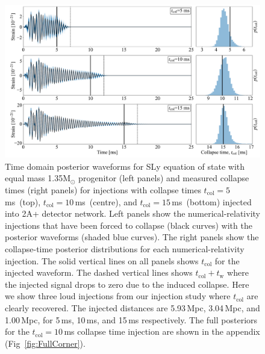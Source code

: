 \documentclass[
reprint,
prd,
twocolumn,
nofootinbib,
 amsmath,
showpacs ,amssymb, aps,%
superscriptaddress
]{revtex4-1}
\newcommand{\tc}{t_{\mathrm{col}}}
\newcommand{\tw}{t_{\mathrm{w}}}
\begin{document}
    
\begin{figure}[t]
        \centering
        \includegraphics[scale=0.35]{images/dec_tc10_dist_timeplot_panels.pdf}
        \caption{Time domain posterior waveforms for SLy equation of state with equal mass 1.35M${_\odot}$ progenitor (left panels) and measured collapse times (right panels) for injections with collapse times $\tc=5$\,ms~(top), $\tc=10$\,ms~(centre), and $\tc=15$\,ms~(bottom) injected into 2A+ detector network. Left panels show the numerical-relativity injections that have been forced to collapse (black curves) with the posterior waveforms (shaded blue curves). The right panels show the collapse-time posterior distributions for each numerical-relativity injection.
        The solid vertical lines on all panels shows  $\tc$ for the injected waveform. The dashed vertical lines shows  $\tc+\tw$ where the injected signal drops to zero due to the induced collapse. Here we show three loud injections from our injection study where $\tc$ are clearly recovered. The injected distances are 5.93\,Mpc, 3.04\,Mpc, and 1.00\,Mpc, for 5\,ms,  10\,ms, and  15\,ms respectively. The full posteriors for the $\tc=10\,$ms collapse time   injection are shown in the appendix (Fig~\ref{fig:FullCorner}).} 
        \label{fig:TimeResponse}
\end{figure}     
\end{document}
